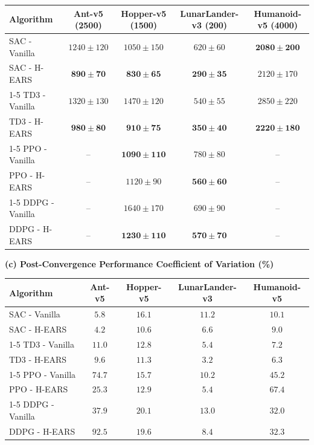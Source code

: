 \documentclass[journal]{IEEEtran}
\begin{document}
\begin{table}[!t]
		\begin{tabular*}{\subtablewidth}{@{\extracolsep{\fill}}lcccc@{}}
			\toprule
			\textbf{Algorithm} & \textbf{Ant-v5 (2500)} & \textbf{Hopper-v5 (1500)} & \textbf{LunarLander-v3 (200)} & \textbf{Humanoid-v5 (4000)} \\
			\midrule
			SAC - Vanilla & $1240 \pm 120$& $1050 \pm 150$& $620 \pm 60$ & $\mathbf{2080 \pm 200}$ \\
			SAC - H-EARS & $\mathbf{890 \pm 70}$  & $\mathbf{830 \pm 65}$  & $\mathbf{290 \pm 35}$ & $2120 \pm 170$ \\
			\cmidrule(lr){1-5}
			TD3 - Vanilla & $1320 \pm 130$& $1470 \pm 120$& $540 \pm 55$ & $2850 \pm 220$ \\
			TD3 - H-EARS & $\mathbf{980 \pm 80}$  & $\mathbf{910 \pm 75}$  & $\mathbf{350 \pm 40}$ & $\mathbf{2220 \pm 180}$ \\
			\cmidrule(lr){1-5}
			PPO - Vanilla & -- & $\mathbf{1090 \pm 110}$& $780 \pm 80$ & -- \\
			PPO - H-EARS & -- & $1120 \pm 90$ & $\mathbf{560 \pm 60}$ & -- \\
			\cmidrule(lr){1-5}
			DDPG - Vanilla & -- & $1640 \pm 170$& $690 \pm 90$ & -- \\
			DDPG - H-EARS & -- & $\mathbf{1230 \pm 110}$& $\mathbf{570 \pm 70}$ & -- \\
			\bottomrule
		\end{tabular*}
		
		\vspace{4mm}

		\textbf{(c) Post-Convergence Performance Coefficient of Variation (\%)}\\[1mm]
		
		\begin{tabular*}{\subtablewidth}{@{\extracolsep{\fill}}lcccc@{}}
			\toprule
			\textbf{Algorithm} & \textbf{Ant-v5} & \textbf{Hopper-v5} & \textbf{LunarLander-v3} & \textbf{Humanoid-v5} \\
			\midrule
			SAC - Vanilla & $5.8$ & $16.1$ & $11.2$  & $10.1$ \\
			SAC - H-EARS & $\mathbf{4.2}$ & $\mathbf{10.6}$ & $\mathbf{6.6}$   & $\mathbf{9.0}$  \\
			\cmidrule(lr){1-5}
			TD3 - Vanilla & $11.0$ & $12.8$ & $5.4$   & $7.2$ \\
			TD3 - H-EARS & $\mathbf{9.6}$ & $\mathbf{11.3}$ & $\mathbf{3.2}$   & $\mathbf{6.3}$  \\
			\cmidrule(lr){1-5}
			PPO - Vanilla & $74.7$ & $15.7$ & $10.2$ & $\mathbf{45.2}$ \\
			PPO - H-EARS & $\mathbf{25.3}$ & $\mathbf{12.9}$ & $\mathbf{5.4}$   & $67.4$ \\
			\cmidrule(lr){1-5}
			DDPG - Vanilla & $\mathbf{37.9}$ & $20.1$ & $13.0$  & $\mathbf{32.0}$ \\
			DDPG - H-EARS & $92.5$ & $\mathbf{19.6}$ & $\mathbf{8.4}$   & $32.3$ \\
			\bottomrule
		\end{tabular*}
		

\end{table}
\end{document}
